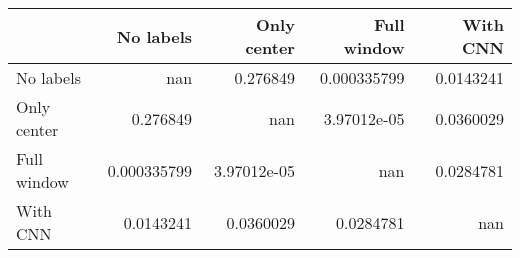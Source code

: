 \begin{tabular}{lrrrr}
\toprule
             &     No labels &   Only center &   Full window &    With CNN \\
\midrule
 No labels   & nan           &   0.276849    &   0.000335799 &   0.0143241 \\
 Only center &   0.276849    & nan           &   3.97012e-05 &   0.0360029 \\
 Full window &   0.000335799 &   3.97012e-05 & nan           &   0.0284781 \\
 With CNN    &   0.0143241   &   0.0360029   &   0.0284781   & nan         \\
\bottomrule
\end{tabular}